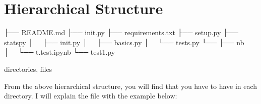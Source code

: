 \documentclass[letterpaper,12pt,english]{sphinxmanual}
\begin{document}
\section{Hierarchical Structure}
\label{\detokenize{pack:hierarchical-structure}}
\begin{sphinxVerbatim}[commandchars=\\\{\}]
├── README.md
├── \PYGZus{}\PYGZus{}init\PYGZus{}\PYGZus{}.py
├── requirements.txt
├── setup.py
├── statspy
│   ├── \PYGZus{}\PYGZus{}init\PYGZus{}\PYGZus{}.py
│   ├── basics.py
│   └── tests.py
└── 
    ├── nb
    │   └── t.test.ipynb
    └── test1.py

 directories,  files
\end{sphinxVerbatim}

From the above hierarchical structure, you will find that you have to have  in each directory. I will explain the  file with the example below:
\end{document}

